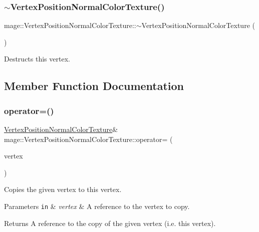 \subsubsection{\texorpdfstring{$\sim$\+Vertex\+Position\+Normal\+Color\+Texture()}{~VertexPositionNormalColorTexture()}}
{\footnotesize\ttfamily mage\+::\+Vertex\+Position\+Normal\+Color\+Texture\+::$\sim$\+Vertex\+Position\+Normal\+Color\+Texture (\begin{DoxyParamCaption}{ }\end{DoxyParamCaption})\hspace{0.3cm}{\ttfamily [default]}}

Destructs this vertex. 

\subsection{Member Function Documentation}
\hypertarget{structmage_1_1_vertex_position_normal_color_texture_a2053f5942c404f3d42f6e5a129c3e694}{}\label{structmage_1_1_vertex_position_normal_color_texture_a2053f5942c404f3d42f6e5a129c3e694} 
\subsubsection{\texorpdfstring{operator=()}{operator=()}\hspace{0.1cm}{\footnotesize\ttfamily [1/2]}}
{\footnotesize\ttfamily \hyperlink{structmage_1_1_vertex_position_normal_color_texture}{Vertex\+Position\+Normal\+Color\+Texture}\& mage\+::\+Vertex\+Position\+Normal\+Color\+Texture\+::operator= (\begin{DoxyParamCaption}\item[{const \hyperlink{structmage_1_1_vertex_position_normal_color_texture}{Vertex\+Position\+Normal\+Color\+Texture} \&}]{vertex }\end{DoxyParamCaption})\hspace{0.3cm}{\ttfamily [default]}}

Copies the given vertex to this vertex.


\begin{DoxyParams}[1]{Parameters}
\mbox{\tt in}  & {\em vertex} & A reference to the vertex to copy. \\
\hline
\end{DoxyParams}
\begin{DoxyReturn}{Returns}
A reference to the copy of the given vertex (i.\+e. this vertex). 
\end{DoxyReturn}
\hypertarget{structmage_1_1_vertex_position_normal_color_texture_a98da26b1f52c0b98b44fd3a99080615a}{}\label{structmage_1_1_vertex_position_normal_color_texture_a98da26b1f52c0b98b44fd3a99080615a} 
